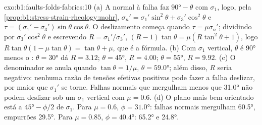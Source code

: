 \begin{solution}{exo:b1:faults-folds-fabrics:10}
(a) A normal à falha faz $\ang{90} - \theta$ com $\sigma_1$, logo, pela
\cref{prop:b1:stress-strain-rheology:mohr},
$\sigma_n' = \sigma_1'\sin^2\theta + \sigma_3'\cos^2\theta$ e
$\tau = (\sigma_1' - \sigma_3')\sin\theta\cos\theta$. O deslizamento começa quando
$\tau = \mu\sigma_n'$; dividindo por $\sigma_3'\cos^2\theta$ e escrevendo
$R = \sigma_1'/\sigma_3'$, $(R - 1)\tan\theta = \mu(R\tan^2\theta + 1)$, logo
$R\tan\theta(1 - \mu\tan\theta) = \tan\theta + \mu$, que é a fórmula.
(b) Com $\sigma_1$ vertical, $\theta$ é \ang{90} menos o :
$\theta = \ang{30}$ dá $R = 3.12$; $\theta = \ang{45}$, $R = 4.00$;
$\theta = \ang{55}$, $R = 9.92$. (c) O denominador se anula quando
$\tan\theta = 1/\mu$, $\theta = \ang{59.0}$; além disso, $R$ seria negativo:
nenhuma razão de tensões efetivas positivas pode fazer a falha deslizar, por maior que
$\sigma_1'$ se torne. Falhas normais que mergulham menos que \ang{31.0} não podem deslizar
sob um $\sigma_1$ vertical com $\mu = 0.6$. (d) O plano mais bem orientado está a
$\ang{45} - \phi/2$ de $\sigma_1$. Para $\mu = 0.6$, $\phi = \ang{31.0}$:
falhas normais mergulham \ang{60.5}, empurrões \ang{29.5}. Para $\mu = 0.85$,
$\phi = \ang{40.4}$: \ang{65.2} e \ang{24.8}.
\end{solution}

